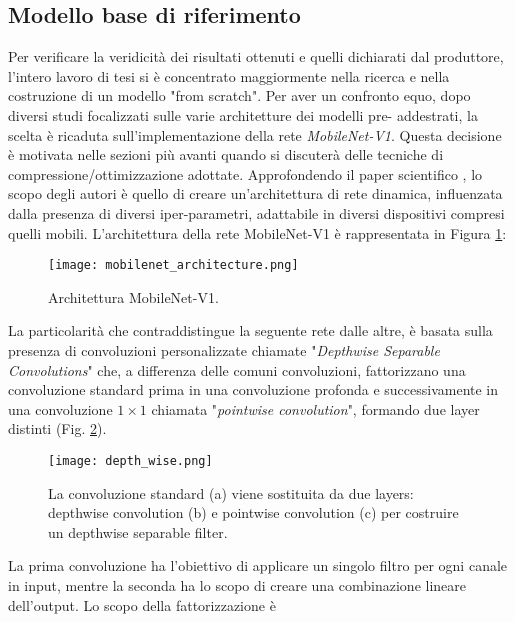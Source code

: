 \subsection{Modello base di riferimento}\label{MBNET}
Per verificare la veridicità dei risultati ottenuti e quelli dichiarati dal produttore, 
l'intero lavoro di tesi si è concentrato maggiormente nella ricerca 
e nella costruzione di un modello "from scratch". Per aver un confronto 
equo, dopo diversi studi focalizzati sulle varie architetture dei modelli pre-
addestrati, la scelta è ricaduta sull'implementazione della rete \emph{MobileNet-V1}. 
Questa decisione è motivata nelle sezioni più avanti quando si discuterà 
delle tecniche di compressione/ottimizzazione adottate. Approfondendo il 
paper scientifico \cite{howard2017mobilenets}, lo scopo degli autori è quello di creare un'architettura 
di rete dinamica, influenzata dalla presenza di diversi iper-parametri, adattabile 
in diversi dispositivi compresi quelli mobili. L'architettura della rete 
MobileNet-V1 è rappresentata in Figura \ref{mobilenetV1}:
\begin{figure}
    \centering
    \texttt{[image: mobilenet\_architecture.png]}
    \centering
    \caption{Architettura MobileNet-V1.}
    \label{mobilenetV1}
\end{figure}
La particolarità che contraddistingue 
la seguente rete dalle altre, è basata sulla presenza di convoluzioni 
personalizzate chiamate "\emph{Depthwise Separable Convolutions}" che, a differenza 
delle comuni convoluzioni, fattorizzano una convoluzione standard 
prima in una convoluzione profonda e successivamente in una convoluzione 
$1\times{1}$ chiamata "\emph{pointwise convolution}", formando due layer distinti (Fig. 
\ref{depth_wise}).
\begin{figure}
    \centering
    \texttt{[image: depth\_wise.png]}
    \centering
    \caption{La convoluzione standard (a) viene sostituita da due layers: depthwise convolution (b) e pointwise convolution (c) per costruire un depthwise separable filter.}
    \label{depth_wise}
\end{figure}
La prima convoluzione ha l'obiettivo di applicare un 
singolo filtro per ogni canale in input, mentre la seconda ha lo scopo di 
creare una combinazione lineare dell'output. Lo scopo della fattorizzazione è 
